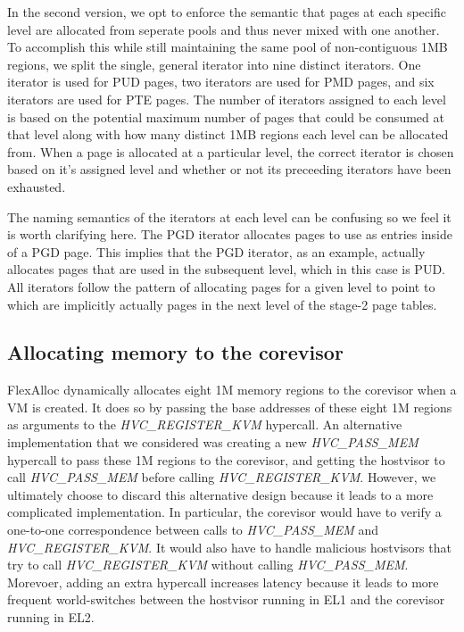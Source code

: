 In the second version, we opt to enforce the semantic that pages at each specific level are
allocated from seperate pools and thus never mixed with one another. To accomplish this while still maintaining the same pool of non-contiguous 1MB regions,
we split the single, general iterator into nine distinct iterators. One iterator is used
for PUD pages, two iterators are used for PMD pages, and six iterators are used for PTE pages.
The number of iterators assigned to each level is based on the potential maximum number of
pages that could be consumed at that level along with how many distinct 1MB regions each level
can be allocated from. When a page is allocated at a particular level, the correct iterator is chosen based on
it's assigned level and whether or not its preceeding iterators have been exhausted.

The naming semantics of the iterators at each level can be confusing so we feel it is worth
clarifying here. The PGD iterator allocates pages to use as entries inside of a PGD page. This
implies that the PGD iterator, as an example, actually allocates pages that are used in the
subsequent level, which in this case is PUD. All iterators follow the pattern of allocating
pages for a given level to point to which are implicitly actually pages in the next level
of the stage-2 page tables.


\subsection{Allocating memory to the corevisor}

FlexAlloc dynamically allocates eight 1M memory regions to the corevisor when a
VM is created. It does so by passing the base addresses of these eight 1M
regions as arguments to the \textit{HVC\_REGISTER\_KVM} hypercall. An alternative
implementation that we considered was creating a new \textit{HVC\_PASS\_MEM} hypercall to pass these
1M regions to the corevisor, and getting the hostvisor to call \textit{HVC\_PASS\_MEM}
before calling \textit{HVC\_REGISTER\_KVM}. However, we ultimately choose to
discard this alternative design because it leads to a more complicated
implementation. In particular, the corevisor would have to verify a one-to-one
correspondence between calls to \textit{HVC\_PASS\_MEM} and \textit{HVC\_REGISTER\_KVM}.
It would also have to handle malicious hostvisors that try to call
\textit{HVC\_REGISTER\_KVM} without calling \textit{HVC\_PASS\_MEM}. Morevoer,
adding an extra hypercall increases latency because it leads to more frequent
world-switches between the hostvisor running in EL1 and the corevisor running in EL2.

